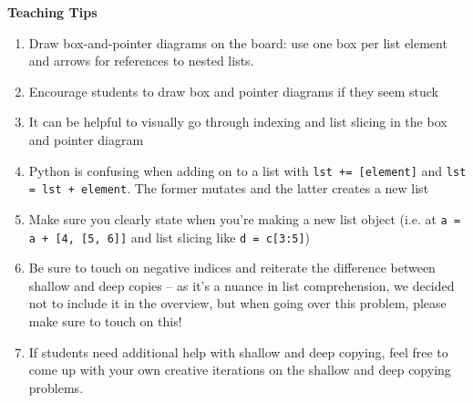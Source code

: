\begin{questionmeta}
    \textbf{Teaching Tips}
    \begin{enumerate}
            \item Draw box-and-pointer diagrams on the board: use one box per list element and arrows for references to nested lists.
            \item Encourage students to draw box and pointer diagrams if they seem stuck
            \item It can be helpful to visually go through indexing and list slicing in the box and pointer diagram
            \item Python is confusing when adding on to a list with \lstinline{lst += [element]} and \lstinline{lst = lst + element}. The former mutates and the latter creates a new list
            \item Make sure you clearly state when you’re making a new list object (i.e. at \lstinline{a = a + [4, [5, 6]]} and list slicing like \lstinline{d = c[3:5]})
            \item Be sure to touch on negative indices and reiterate the difference between shallow and deep copies -- as it's a nuance in list comprehension, we decided not to include it in the overview, but when going over this problem, please make sure to touch on this!
            \item If students need additional help with shallow and deep copying, feel free to come up with your own creative iterations on the shallow and deep copying problems.
    \end{enumerate}
\end{questionmeta}
